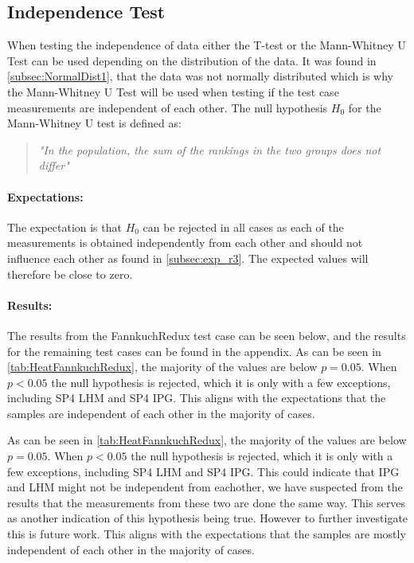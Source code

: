 

\subsection{Independence Test}\label{subsec:independence1}

When testing the independence of data either the T-test or the Mann-Whitney U Test can be used depending on the distribution of the data. It was found in \cref{subsec:NormalDist1}, that the data was not normally distributed which is why the Mann-Whitney U Test will be used when testing if the test case measurements are independent of each other. The null hypothesis $H_0$ for the Mann-Whitney U test is defined as:

\begin{quote}
    \textit{"In the population, the sum of the rankings in the two groups does not differ"}\cite[]{mann1947test}
\end{quote}

\paragraph{Expectations:} The expectation is that $H_0$ can be rejected in all cases as each of the measurements is obtained independently from each other and should not influence each other as found in \cref{subsec:exp_r3}. The expected values will therefore be close to zero.

\paragraph{Results:}
The results from the FannkuchRedux test case can be seen below, and the results for the remaining test cases can be found in the appendix. As can be seen in \cref{tab:HeatFannkuchRedux}, the majority of the values are below $p = 0.05$. When $p < 0.05$ the null hypothesis is rejected, which it is only with a few exceptions, including SP4 LHM and SP4 IPG. This aligns with the expectations that the samples are independent of each other in the majority of cases.

 

As can be seen in \cref{tab:HeatFannkuchRedux}, the majority of the values are below $p = 0.05$. When $p < 0.05$ the null hypothesis is rejected, which it is only with a few exceptions, including SP4 LHM and SP4 IPG. This could indicate that IPG and LHM might not be independent from eachother, we have suspected from the results that the measurements from these two are done the same way. This serves as another indication of this hypothesis being true. However to further investigate this is future work.
This aligns with the expectations that the samples are mostly independent of each other in the majority of cases.

